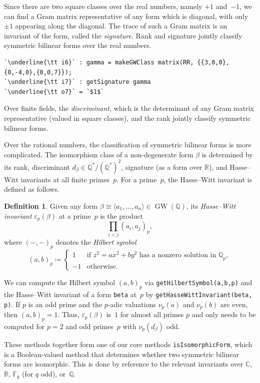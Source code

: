 \documentclass[12pt]{amsart}
\theoremstyle{definition}
\newtheorem{definition}[theorem]{Definition}
\DeclareMathOperator{\GW}{GW}
\begin{document}
Since there are two square classes over the real numbers, namely $+1$ and~$-1$, we can find a Gram matrix representative of any form which is diagonal, with only $\pm1$ appearing along the diagonal. The trace of such a Gram matrix is an invariant of the form, called the \emph{signature}. Rank and signature jointly classify symmetric bilinear forms over the real numbers.

\begin{lstlisting}[language=Macaulay2output]
`\underline{\tt i6}` : gamma = makeGWClass matrix(RR, {{3,0,0},{0,-4,0},{0,0,7}});
`\underline{\tt i7}` : getSignature gamma
`\underline{\tt o7}` = `$1$`
\end{lstlisting}

Over finite fields, the \emph{discriminant}, which is the determinant of any Gram matrix representative (valued in square classes), and the rank jointly classify symmetric bilinear forms.

Over the rational numbers, the classification of symmetric bilinear forms is more complicated. The isomorphism class of a non-degenerate form $\beta$ is determined by its rank, discriminant $d_\beta\in \mathbb{Q^*}/(\mathbb{Q^*})^2$, signature (as a form over $\mathbb{R}$), and Hasse--Witt invariants at all finite primes~$p$. For a prime~$p$, the Hasse--Witt invariant \cite[III5, p.79]{MH} is defined as follows.
\begin{definition}\label{def:labelname} 
Given any form $\beta \cong \langle a_1, \dots, a_n \rangle \in \GW(\mathbb{Q})$, its \emph{Hasse--Witt invariant} $\varepsilon_p(\beta)$ at a prime~$p$
is the product
\[
\prod_{i<j} (a_i,a_j)_p,
\]
where $( -,- )_p$ denotes the \emph{Hilbert symbol}
\[
(a,b)_p \coloneqq \begin{cases} 
1 & \text{if } z^2 = ax^2 + by^2 \text{ has a nonzero solution in } \mathbb{Q}_p, \\
-1 & \text{otherwise.} \end{cases}
\]
\end{definition}
We can compute the Hilbert symbol $(a,b)_p$ via \texttt{getHilbertSymbol(a,b,p)} and the Hasse--Witt invariant of a form \texttt{beta} at~$p$ by \texttt{getHasseWittInvariant(beta, p)}. If $p$ is an odd prime and the $p$-adic valuations
$\nu_p(a)$ and $\nu_p(b)$ are even, then $(a,b)_p=1$. Thus, 
$\varepsilon_p(\beta)$ is~$1$ for almost all primes $p$ and only needs to be computed for $p=2$ and odd primes~$p$ with $\nu_p(d_\beta)$ odd.

These methods together form one of our core methods \texttt{isIsomorphicForm}, which is a Boolean-valued method that determines whether two symmetric bilinear forms are isomorphic. This is done by reference to the relevant invariants over $\mathbb{C}$, $\mathbb{R}$, $\mathbb{F}_q$ (for $q$ odd), or~$\mathbb{Q}$. 
\end{document}
